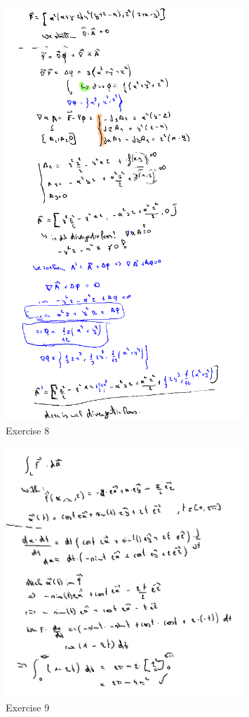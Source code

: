 \documentclass[a4paper]{report}
\begin{document}
\begin{figure}[H]
	\centering
	\includegraphics[width=0.8\textwidth]{assets/huis_6_ex_8.png}
	\caption{Exercise 8}
	\label{fig:huis_6_ex_8}
\end{figure}

\begin{figure}[H]
	\centering
	\includegraphics[width=0.8\textwidth]{assets/huis_6_ex_9.png}
	\caption{Exercise 9}
	\label{fig:huis_6_ex_9}
\end{figure}
\end{document}

